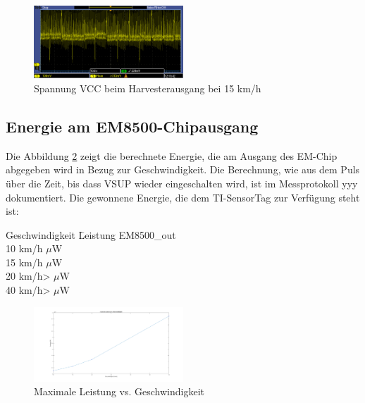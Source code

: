 \begin{figure}[ht]
    \includegraphics[width=0.5\textwidth]{4Resultate/imag/SpannungVCC_100uF.png} 
    \caption{Spannung VCC beim Harvesterausgang bei 15 km/h}
    \label{resultat_Harvester_Spannung_100uF}
\end{figure}


\subsection{Energie am EM8500-Chipausgang}

Die Abbildung \ref{energie_resultat_harvester} zeigt die berechnete Energie, die am Ausgang des EM-Chip abgegeben wird in Bezug zur Geschwindigkeit. Die Berechnung, wie aus dem Puls über die Zeit, bis dass VSUP wieder eingeschalten wird, ist im  Messprotokoll yyy dokumentiert. Die gewonnene Energie, die dem TI-SensorTag zur Verfügung steht ist:


\begin{minipage}{\textwidth}
    \label{res_em_aus}
    \begin{tabbing}
        Geschwindigkeit \quad\= Leistung EM8500\_out \\[0.8ex]
        10 km/h     $\mu$W\\
        15 km/h    $\mu$W\\
        20 km/h>   $\mu$W\\
        40 km/h>  $\mu$W\\
    \end{tabbing}
\end{minipage}


\begin{figure}[ht]
    \includegraphics[width=0.5\textwidth]{4Resultate/imag/ResultatLeistungGeschwindigkeit.png} 
    \caption{Maximale Leistung vs. Geschwindigkeit}
    \label{energie_resultat_harvester}
\end{figure}

